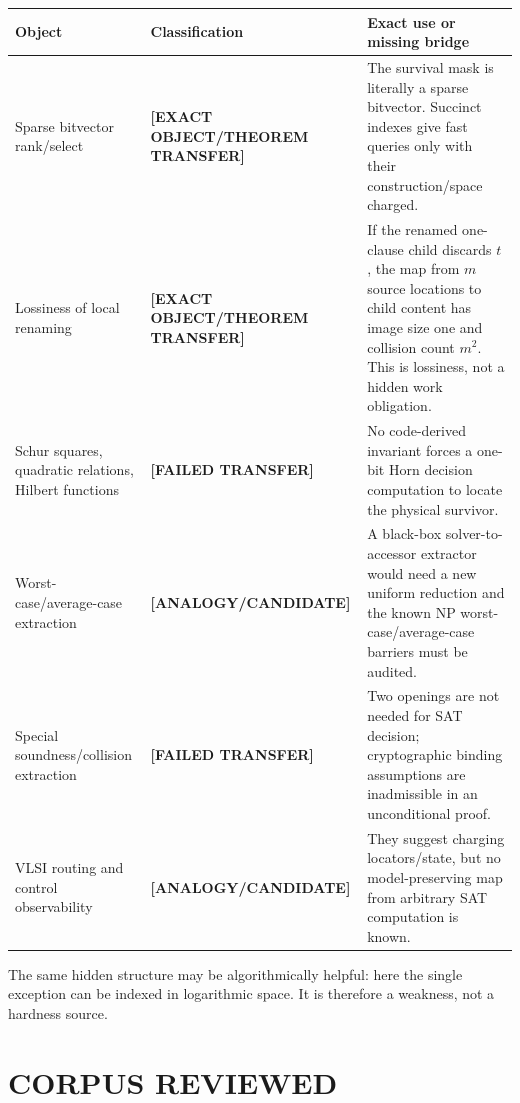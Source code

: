 \documentclass[11pt]{article}
\newcommand{\status}[1]{\textbf{[#1]}}
\begin{document}
\begin{center}
\begin{tabular}{>{\raggedright\arraybackslash}p{.28\linewidth}
                >{\raggedright\arraybackslash}p{.25\linewidth}
                >{\raggedright\arraybackslash}p{.39\linewidth}}
\toprule
Object & Classification & Exact use or missing bridge\\
\midrule
Sparse bitvector rank/select & \status{EXACT OBJECT/THEOREM TRANSFER} &
The survival mask is literally a sparse bitvector.  Succinct indexes give
fast queries only with their construction/space charged.\\
Lossiness of local renaming & \status{EXACT OBJECT/THEOREM TRANSFER} &
If the renamed one-clause child discards $t$, the map from $m$ source
locations to child content has image size one and collision count $m^2$.
This is lossiness, not a hidden work obligation.\\
Schur squares, quadratic relations, Hilbert functions &
\status{FAILED TRANSFER} & No code-derived invariant forces a one-bit Horn
decision computation to locate the physical survivor.\\
Worst-case/average-case extraction & \status{ANALOGY/CANDIDATE} & A black-box
solver-to-accessor extractor would need a new uniform reduction and the known
NP worst-case/average-case barriers must be audited.\\
Special soundness/collision extraction & \status{FAILED TRANSFER} & Two
openings are not needed for SAT decision; cryptographic binding assumptions
are inadmissible in an unconditional proof.\\
VLSI routing and control observability & \status{ANALOGY/CANDIDATE} & They
suggest charging locators/state, but no model-preserving map from arbitrary
SAT computation is known.\\
\bottomrule
\end{tabular}
\end{center}

The same hidden structure may be algorithmically helpful: here the single
exception can be indexed in logarithmic space.  It is therefore a weakness,
not a hardness source.

\section{CORPUS REVIEWED}
\end{document}

